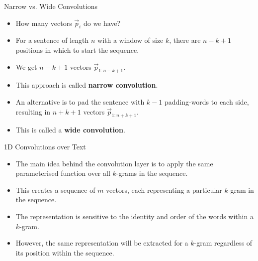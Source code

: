\begin{frame}{Narrow vs. Wide Convolutions}
\begin{scriptsize}
\begin{itemize}
\item How many vectors $\vec{p}_i$ do we have?
\item For a sentence of length $n$ with a window of size $k$, there are $n - k + 1$ positions in which to start the sequence. 
\item We get $n - k + 1$ vectors $\vec{p}_{1:n-k+1}$. 
\item This approach is called \textbf{narrow convolution}.
\item An alternative is to pad the sentence with $k - 1$ padding-words to each side, resulting in $n+k+1$ vectors $\vec{p}_{1:n+k+1}$. 
\item This is called a \textbf{wide convolution}.
\end{itemize}
\end{scriptsize}
\end{frame}


\begin{frame}{1D Convolutions over Text}
\begin{scriptsize}
\begin{itemize}
\item The main idea behind the convolution layer is to apply the same parameterised function over all $k$-grams in the sequence.
\item This creates a sequence of $m$ vectors, each representing
a particular $k$-gram in the sequence.
\item The representation is sensitive to the identity and order of the words within a $k$-gram.
\item However, the same representation will be extracted for a $k$-gram regardless of its position within the sequence.
\end{itemize}
\end{scriptsize}
\end{frame}



